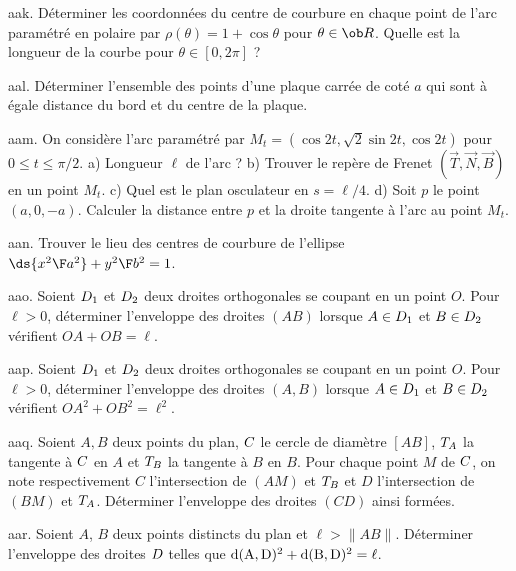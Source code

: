 \exo [Level=2,Fight=1,Learn=0,Field=\Courbure|\AbscisseCurviligne,Type=\Exercices,Origin=] aak. 
Déterminer les coordonnées du centre de courbure en chaque point 
de l'arc paramétré en polaire par $\rho(\theta)=1+\cos\theta$ pour $\theta\in\ob R$. 
Quelle est la longueur  de la courbe pour $\theta\in[0,2\pi]$ ? 

\exo [Level=2,Fight=1,Learn=0,Field=\Coniques|GéométriePlane,Type=\Exercices,Origin=] aal. 
Déterminer l'ensemble des points d'une plaque carrée de coté $a$ 
qui sont à égale distance du bord et du centre de la plaque. 

\exo [Level=2,Fight=1,Learn=1,Field=\RepèreDeFrenet|\AbscisseCurviligne,Type=\Exercices,Origin=] aam. 
On considère l'arc paramétré par $M_t=(\cos 2t, \sqrt 2\sin 2t, \cos 2t)$ pour $0\le t\le \pi/2$. \pn
a) Longueur $\ell$ de l'arc ?\pn
b) Trouver le repère de Frenet $(\vec T,\vec N,\vec B)$ en un point $M_t$. \pn
c) Quel est le plan osculateur en $s=\ell/4$. \pn
d) Soit $p$ le point $(a,0,-a)$. Calculer la distance entre $p$ et 
la droite tangente à l'arc au point $M_{t}$. 
 
\exo [Level=2,Fight=1,Learn=2,Field=\Développantes,Type=\Exercices,Origin=] aan. Trouver le lieu des centres de courbure 
de l'ellipse $\ds{x^2\F a^2}+{y^2\F b^2}=1$. 

\exo [Level=2,Fight=1,Learn=0,Field=\Enveloppes,Type=\Exercices,Origin=]  aao. 
Soient $\sc D_1$ et $\sc D_2$ deux droites orthogonales 
se coupant en un point $O$. Pour~$\ell>0$, 
déterminer l'enveloppe des droites $(AB)$ lorsque $\sc A\in\sc D_1$ et $B\in\sc D_2$ vérifient $OA+OB=\ell$.

\exo [Level=2,Fight=1,Learn=0,Field=\Enveloppes,Type=\Exercices,Origin=] aap. 
Soient $\sc D_1$ et $\sc D_2$ deux droites orthogonales 
se coupant en un point $O$. 
Pour~$\ell>0$, 
déterminer l'enveloppe des droites $(A,B)$ lorsque $\sc A\in\sc D_1$ et $B\in\sc D_2$ vérifient $OA^2+OB^2=\ell^2$.
 
\exo [Level=2,Fight=1,Learn=0,Field=\Enveloppes,Type=\Exercices,Origin=] aaq. 
Soient $A,B$ deux points du plan, $\sc C$ le cercle de diamètre $[AB]$, $\sc T_A$ 
la tangente à $\sc C$ en $A$ et $\sc T_B$ la tangente à $B$ en $B$. 
Pour chaque point $M$ de $\sc C$, on note respectivement $C$ 
l'intersection de $(AM)$ et $\sc T_B$ et $D$ l'intersection de $(BM)$ et $\sc T_A$. 
Déterminer l'enveloppe des droites $(CD)$ ainsi formées. 

\exo [Level=2,Fight=1,Learn=0,Field=\Enveloppes,Type=\Exercices,Origin=] aar. 
Soient $A$, $B$ deux points distincts du plan et $\ell>\|AB\|$. 
Déterminer l'enveloppe des droites $\sc D$ telles que 
$\rm d(A,\sc D)^2+\rm d(B,\sc D)^2=\ell$. 

